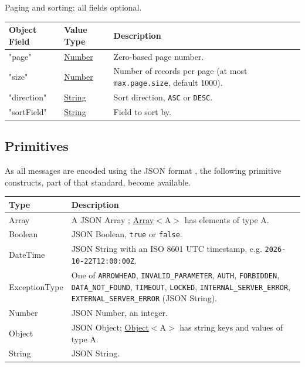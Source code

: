 \documentclass[a4paper]{arrowhead}
\newcommand{\pdef}[1]{{\textcolor{ArrowheadGrey}{#1 \label{sec:model:primitives:#1} \label{sec:model:primitives:#1s}}}}
\newcommand{\pref}[1]{{\textcolor{ArrowheadGrey}{\hyperref[sec:model:primitives:#1]{#1}}}}
\begin{document}

Paging and sorting; all fields optional.


\noindent\begin{tabularx}{\textwidth}{| >{\raggedright\arraybackslash}p{3.9cm} | >{\raggedright\arraybackslash\small}p{5.3cm} | X |} \hline
\rowcolor{gray!33} Object Field & Value Type & Description \\ \hline
"page" & \pref{Number} & Zero-based page number. \\ \hline
"size" & \pref{Number} & Number of records per page (at most \texttt{max.\allowbreak{}page.\allowbreak{}size}, default 1000). \\ \hline
"direction" & \pref{String} & Sort direction, \texttt{ASC} or \texttt{DESC}. \\ \hline
"sort\allowbreak{}Field" & \pref{String} & Field to sort by. \\ \hline
\end{tabularx}



\subsection{Primitives}
\label{sec:model:primitives}

As all messages are encoded using the JSON format \cite{rfc8259}, the following primitive constructs, part of that standard, become available.

\noindent\begin{tabularx}{\textwidth}{| p{4.6cm} | X |} \hline
\rowcolor{gray!33} Type & Description \\ \hline
\pdef{Array} & A JSON Array \cite{rfc8259}; \pref{Array}$<$A$>$ has elements of type A. \\ \hline
\pdef{Boolean} & JSON Boolean, \texttt{true} or \texttt{false}. \\ \hline
\pdef{DateTime} & JSON String with an ISO 8601 UTC timestamp, e.g. \texttt{2026-10-22T12:00:00Z}. \\ \hline
\pdef{ExceptionType} & One of \texttt{ARROWHEAD}, \texttt{INVALID\_\allowbreak{}PARAMETER}, \texttt{AUTH}, \texttt{FORBIDDEN}, \texttt{DATA\_\allowbreak{}NOT\_\allowbreak{}FOUND}, \texttt{TIMEOUT}, \texttt{LOCKED}, \texttt{INTERNAL\_\allowbreak{}SERVER\_\allowbreak{}ERROR}, \texttt{EXTERNAL\_\allowbreak{}SERVER\_\allowbreak{}ERROR} (JSON String). \\ \hline
\pdef{Number} & JSON Number, an integer. \\ \hline
\pdef{Object} & JSON Object; \pref{Object}$<$A$>$ has string keys and values of type A. \\ \hline
\pdef{String} & JSON String. \\ \hline
\end{tabularx}
\end{document}

